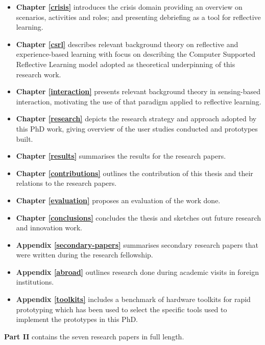 \begin{itemize}
	\item \textbf{Chapter \ref{crisis}} introduces the crisis domain providing an overview on scenarios, activities and roles; and presenting debriefing as a tool for reflective learning.

	\item \textbf{Chapter \ref{csrl}} describes relevant background theory on reflective and experience-based learning with focus on describing the Computer Supported Reflective Learning model adopted as theoretical underpinning of this research work.

	\item \textbf{Chapter \ref{interaction}} presents relevant background theory in sensing-based interaction, motivating the use of that paradigm applied to reflective learning.

	\item \textbf{Chapter \ref{research}} depicts the research strategy and approach adopted by this PhD work, giving overview of the user studies conducted and prototypes built.

	\item \textbf{Chapter \ref{results}} summarises the results for the research papers.

	\item \textbf{Chapter \ref{contributions}} outlines the contribution of this thesis and their relations to the research papers.

	\item \textbf{Chapter \ref{evaluation}} proposes an evaluation of the work done.

	\item \textbf{Chapter \ref{conclusions}} concludes the thesis and sketches out future research and innovation work.

	\item \textbf{Appendix \ref{secondary-papers}} summarises secondary research papers that were written during the research fellowship.

	\item \textbf{Appendix \ref{abroad}} outlines research done during academic visits in foreign institutions.

	\item \textbf{Appendix \ref{toolkits}} includes a benchmark of hardware toolkits for rapid prototyping which has been used to select the specific tools used to implement the prototypes in this PhD. 
\end{itemize}

\textbf{Part II} contains the seven research papers in full length.
